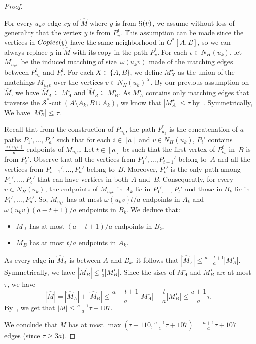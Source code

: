 \documentclass[a4paper,UKenglish,cleveref,hyperref,autoref]{lipics-v2021}
\renewcommand{\leq}{\leqslant}
\begin{document}
\begin{proof}
\begin{itemize}
		For every $u_kv$-edge $xy$ of $\widehat M$ where $y$ is from $\mathcal G(v)$, we assume without loss of generality that the vertex $y$ is from $P_{v}^1$.
		This assumption can be made since the vertices in $\copies(y)$ have the same neighborhood in $G^*[A,B]$, so we can always replace $y$ in $\widehat M$ with its copy in the path $P^1_v$.
		For each $v\in N_H(u_k)$, let $M_{u_kv}$ be the induced matching of size~$\omega(u_kv)$ made of the matching edges between $P_{u_k}^{\ell}$ and $P_{v}^{1}$.
		For each $X\in \{A,B\}$, we define $M_X^\star$ as the union of the matchings $M_{u_kv}$ over the vertices $v\in N_H(u_k)^{X}$.
		By our previous assumption on $\widehat M$, we have $\widehat M_A \subseteq M_A^\star$ and $\widehat M_B \subseteq M_B^\star$.
		As $M_A^\star$ contains only matching edges that traverse the $\mathcal S^*$-cut $(A\setminus A_k, B\cup A_k)$, we know that $|M_A^\star| \leq \tau$ by~.
		Symmetrically, We have $|M_B^\star| \leq \tau$.
		
		Recall that from the construction of $P_{u_k}$, the path  $P_{u_k}^\ell$ is the concatenation of $a$ paths $P_1',\dots,P_a'$ such that for each $i\in [a]$ and $v\in N_H(u_k)$, $P_i'$ contains $\frac{\omega(u_kv)}{a}$ endpoints of $M_{u_kv}$.
		Let $t\in [a]$ be such that the first vertex of $P_{u_k}^\ell$ in~$B$ is from $P_t'$.
		Observe that all the vertices from $P_1',\dots,P_{t-1}'$ belong to~$A$ and all the vertices from $P_{t+1}',\dots,P_{a}'$ belong to~$B$.
		Moreover, $P_t'$ is the only path among $P_1',\dots,P_a'$ that can have vertices in both~$A$ and~$B$.
		Consequently, for every $v\in N_H(u_k)$, the endpoints of $M_{u_kv}$ in $A_k$ lie in $P_1',\dots,P_t'$ and those in $B_k$ lie in $P_t',\dots,P_a'$.
		So, $M_{u_kv}$ has at most $\omega(u_kv) t/a$ endpoints in $A_k$ and $\omega(u_kv)(a-t+1)/a$ endpoints in $B_k$.
		We deduce that:
		\begin{itemize}
			\item $M_A$ has at most $(a-t+1)/a$ endpoints in $B_k$,
			\item $M_B$ has at most $t/a$ endpoints in $A_k$.
		\end{itemize}
		As every edge in $\widehat M_A$ is between $A$ and $B_k$, it follows that $|\widehat M_A | \leq \frac{a-t+1}{a} |M_A^\star|$.
		Symmetrically, we have $|\widehat M_B| \leq \frac{t}{a} |M_B^\star|$.
		Since the sizes of $M_A^\star$ and $M_B^\star$ are at most $\tau$, we have
		\begin{equation*}
			|\widehat M| = |\widehat M_A| + |\widehat M_B| \leq \frac{a-t+1}{a} |M_A^\star| + \frac{t}{a} |M_B^\star|   \leq \frac{a+1}{a} \tau.
		\end{equation*}
		By~, we get that $|M| \leq \frac{a+1}{a} \tau + 107$.
	\end{itemize}
	We conclude  that $M$ has at most $\max(\tau + 110,  \frac{a+1}{a} \tau + 107) =  \frac{a+1}{a} \tau + 107$ edges (since $\tau \geqslant 3a$).
\end{proof}
\end{document}

